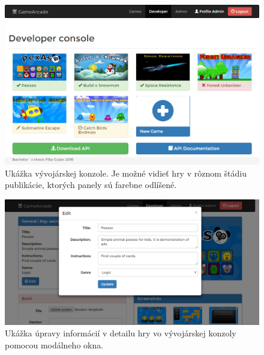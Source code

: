 \begin{figure}[h]
  \centering
  \includegraphics[scale=0.35]{fig/ukazka-zoznam-vyvojar.png}
  \caption{Ukážka vývojárskej konzole. Je možné vidieť hry v rôznom štádiu publikácie, ktorých panely sú farebne odlíšené.}
  \label{fig:ukazka-vyvojar}
\end{figure}

\begin{figure}[h]
  \centering
  \includegraphics[scale=0.35]{fig/ukazka-modalne-okno.png}
  \caption{Ukážka úpravy informácií v detailu hry vo vývojárskej konzoly pomocou modálneho okna.}
  \label{fig:ukazka-modalneokno}
\end{figure}

